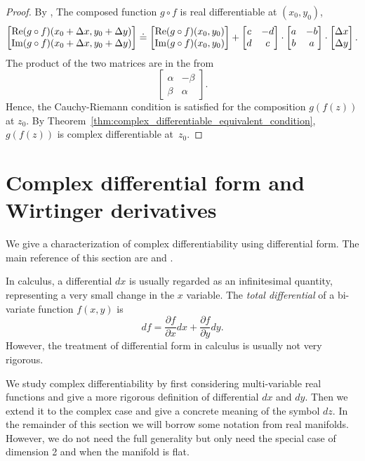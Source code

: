 \begin{proof}
By  \cite[Theorem 9.15]{Rudin}, The composed function $g \circ f$ is real differentiable at $(x_0,y_0)$, 
$$
\begin{bmatrix} \operatorname{\mathrm{Re}}(g\circ f)(x_0+\Delta x, y_0+\Delta y) \\ \operatorname{\mathrm{Im}}(g\circ f)(x_0+\Delta x, y_0 + \Delta y) \end{bmatrix} 
\doteq
\begin{bmatrix} \operatorname{\mathrm{Re}}(g\circ f) (x_0,y_0) \\ \operatorname{\mathrm{Im}}(g\circ f) (x_0,y_0) \end{bmatrix}	+ \begin{bmatrix}
	c & -d \\ d & c
\end{bmatrix} \cdot
\begin{bmatrix}
	a & -b \\ b & a
\end{bmatrix} \cdot
\begin{bmatrix} \Delta x \\ \Delta y \end{bmatrix}.
$$
The product of the two matrices are in the from 
$$
\begin{bmatrix}
	\alpha & -\beta \\ \beta & \alpha
\end{bmatrix}.
$$
Hence, the Cauchy-Riemann condition is satisfied for the composition $g(f(z))$ at $z_0$. By Theorem~\ref{thm:complex_differentiable_equivalent_condition}, $g(f(z))$ is complex differentiable at~$z_0$.
\end{proof}



\section{Complex differential form and Wirtinger derivatives}
We give a characterization of complex differentiability using differential form.
The main reference of this section are \cite[Chapter 5]{Spivak} and \cite[Chapter 1]{ChernChenLam}.

In calculus, a differential $dx$ is usually regarded as an infinitesimal quantity, representing a very small change in the $x$ variable. The {\em total differential} of a bi-variate function $f(x,y)$ is 
$$
df = \frac{\partial f}{\partial x} dx + \frac{\partial f}{\partial y} dy .
$$
However, the treatment of differential form in calculus is usually not very rigorous.

We study complex differentiability by first considering multi-variable real functions and give a more rigorous definition of differential $dx$ and $dy$. Then we extend it to the complex case and give a concrete meaning of the symbol $dz$. In the remainder of this section we will borrow some notation from real manifolds. However, we do not need the full generality but only need the special case of dimension 2 and when the manifold is flat.

